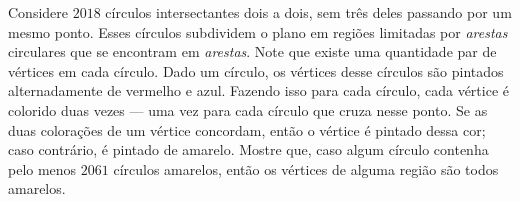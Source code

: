 Considere $2018$ círculos intersectantes dois a dois, sem três deles passando por um mesmo ponto.
Esses círculos subdividem o plano em regiões limitadas por \textit{arestas} circulares que se encontram em \textit{arestas}.
Note que existe uma quantidade par de vértices em cada círculo.
Dado um círculo, os vértices desse círculos são pintados alternadamente de vermelho e azul.
Fazendo isso para cada círculo, cada vértice é colorido duas vezes --- uma vez para cada círculo que cruza nesse ponto.
Se as duas colorações de um vértice concordam, então o vértice é pintado dessa cor; caso contrário, é pintado de amarelo.
Mostre que, caso algum círculo contenha pelo menos $2061$ círculos amarelos, então os vértices de alguma região são todos amarelos.
